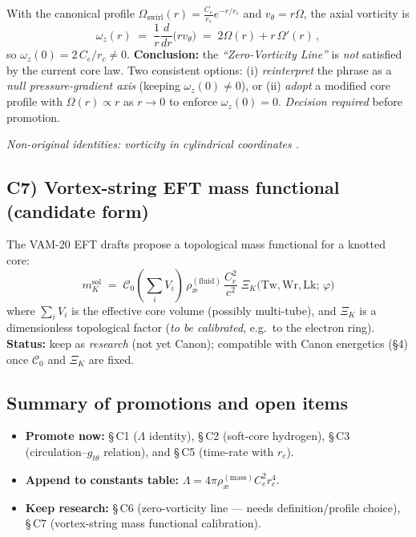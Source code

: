 \documentclass[11pt]{article}
\begin{document}
    With the canonical profile $\Omega_{\text{swirl}}(r)=\tfrac{C_e}{r_c} e^{-r/r_c}$ and $v_\theta=r\Omega$, the axial vorticity is
    \[
        \omega_z(r) \;=\; \frac{1}{r}\frac{d}{dr}\!\big(r v_\theta\big) \;=\; 2\Omega(r)+ r\,\Omega'(r)\,,
    \]
    so $\omega_z(0)=2\,C_e/r_c\neq 0$.
    \textbf{Conclusion:} the \emph{``Zero-Vorticity Line''} is \emph{not} satisfied by the current core law.
    Two consistent options:
    (i) \emph{reinterpret} the phrase as a \emph{null pressure-gradient axis} (keeping $\omega_z(0)\neq 0$), or
    (ii) \emph{adopt} a modified core profile with $\Omega(r)\propto r$ as $r\to 0$ to enforce $\omega_z(0)=0$.
    \emph{Decision required} before promotion.

    \textit{Non-original identities: vorticity in cylindrical coordinates \cite{Batchelor1967}.}

    \subsection*{C7) Vortex-string EFT mass functional (candidate form)}
    \label{subsec:vortex-string-mass}

    The VAM-20 EFT drafts propose a topological mass functional for a knotted core:
    \[
        \boxed{ m_{K}^{\text{sol}} \;=\; \mathcal{C}_0 \left(\sum_i V_i\right)\,
        \rho_{\text{\ae}}^{(\text{fluid})}\,\frac{C_e^2}{c^2}\;
        \Xi_{K}\!\Big(\mathrm{Tw},\mathrm{Wr},\mathrm{Lk};\,\varphi\Big) }
    \]
    where $\sum_i V_i$ is the effective core volume (possibly multi-tube), and $\Xi_K$ is a dimensionless topological factor (\emph{to be calibrated}, e.g.\ to the electron ring).
    \textbf{Status:} keep as \emph{research} (not yet Canon); compatible with Canon energetics (\S4) once $\mathcal{C}_0$ and $\Xi_K$ are fixed.

    \subsection*{Summary of promotions and open items}
    \begin{itemize}
        \item \textbf{Promote now:} \S\,C1 ($\Lambda$ identity), \S\,C2 (soft-core hydrogen), \S\,C3 (circulation–$g_{t\theta}$ relation), and \S\,C5 (time-rate with $r_c$).
        \item \textbf{Append to constants table:} $\Lambda=4\pi\rho_{\text{\ae}}^{(\text{mass})}C_e^2 r_c^4$.
        \item \textbf{Keep research:} \S\,C6 (zero-vorticity line — needs definition/profile choice), \S\,C7 (vortex-string mass functional calibration).
    \end{itemize}
\end{document}
